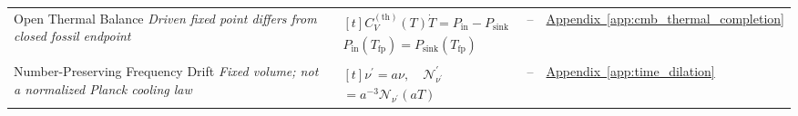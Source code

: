 \begin{longtable}{@{} p{4.5cm} p{6cm} c p{4cm} @{}}
{\raggedright Open Thermal Balance \newline \textit{Driven fixed point differs from closed fossil endpoint}\par} & {\raggedright $\begin{gathered}[t]C_V^{(\mathrm{th})}(T)\dot T=P_{\mathrm{in}}-P_{\mathrm{sink}} \\ P_{\mathrm{in}}(T_{\mathrm{fp}})=P_{\mathrm{sink}}(T_{\mathrm{fp}})\end{gathered}$\par} & -- & {\raggedright \hyperref[app:cmb_thermal_completion]{Appendix~\ref*{app:cmb_thermal_completion}}\par} \\

{\raggedright Number-Preserving Frequency Drift \newline \textit{Fixed volume; not a normalized Planck cooling law}\par} & {\raggedright $\begin{gathered}[t]\nu^{\prime}=a\nu,\quad\mathcal N^{\prime}_{\nu^{\prime}} \\ =a^{-3}\mathcal N_{\nu^{\prime}}(aT)\end{gathered}$\par} & -- & {\raggedright \hyperref[app:time_dilation]{Appendix~\ref*{app:time_dilation}}\par} \\

\bottomrule
\end{longtable}

\endgroup
